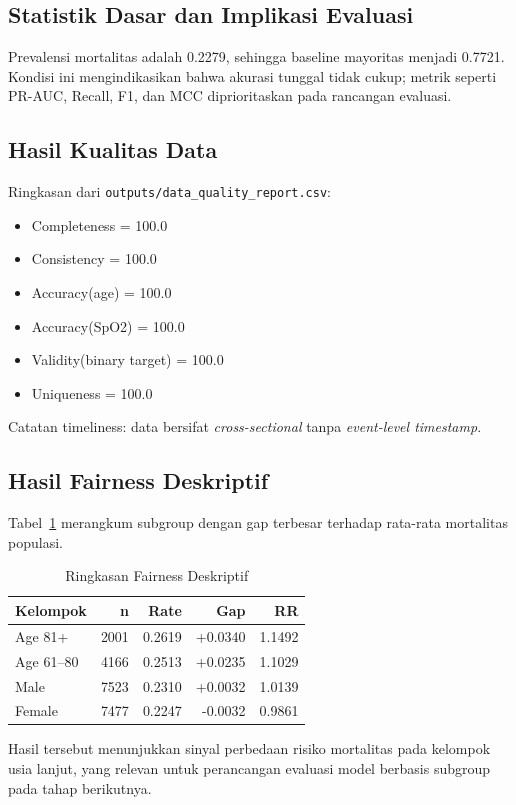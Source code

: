 \documentclass[conference]{IEEEtran}
\begin{document}
\subsection{Statistik Dasar dan Implikasi Evaluasi}
Prevalensi mortalitas adalah 0.2279, sehingga baseline mayoritas menjadi 0.7721. Kondisi ini mengindikasikan bahwa akurasi tunggal tidak cukup; metrik seperti PR-AUC, Recall, F1, dan MCC diprioritaskan pada rancangan evaluasi.

\subsection{Hasil Kualitas Data}
Ringkasan dari \texttt{outputs/data\_quality\_report.csv}:
\begin{itemize}
	\item Completeness = 100.0
	\item Consistency = 100.0
	\item Accuracy(age) = 100.0
	\item Accuracy(SpO2) = 100.0
	\item Validity(binary target) = 100.0
	\item Uniqueness = 100.0
\end{itemize}
Catatan timeliness: data bersifat \textit{cross-sectional} tanpa \textit{event-level timestamp}.

\subsection{Hasil Fairness Deskriptif}
Tabel~\ref{tab:fairness} merangkum subgroup dengan gap terbesar terhadap rata-rata mortalitas populasi.

\begin{table}[ht]
\centering
\caption{Ringkasan Fairness Deskriptif}
\label{tab:fairness}
\begin{tabular}{lrrrr}
\toprule
Kelompok & n & Rate & Gap & RR \\
\midrule
Age 81+ & 2001 & 0.2619 & +0.0340 & 1.1492 \\
Age 61--80 & 4166 & 0.2513 & +0.0235 & 1.1029 \\
Male & 7523 & 0.2310 & +0.0032 & 1.0139 \\
Female & 7477 & 0.2247 & -0.0032 & 0.9861 \\
\bottomrule
\end{tabular}
\end{table}

Hasil tersebut menunjukkan sinyal perbedaan risiko mortalitas pada kelompok usia lanjut, yang relevan untuk perancangan evaluasi model berbasis subgroup pada tahap berikutnya.
\end{document}
